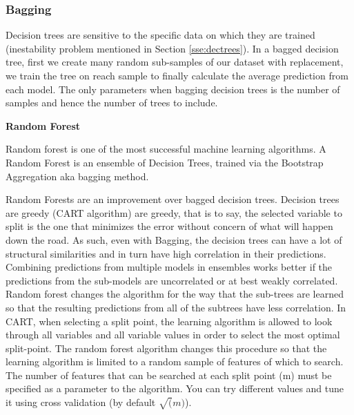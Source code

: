 \documentclass[11pt]{article}
\theoremstyle{definition}
\theoremstyle{remark}
\begin{document}
\subsubsection{Bagging}
\label{se:resrf}

Decision trees are sensitive to the specific data on which they are trained (inestability problem mentioned in Section \ref{sse:dectrees}). In a bagged decision tree, first we create many random sub-samples of our dataset with replacement, we train the tree on reach sample to finally calculate the average prediction from each model. The only parameters when bagging decision trees is the number of samples and hence the number of trees to include.

\textbf{Random Forest}

Random forest is one of the most successful machine learning algorithms. A Random Forest is an ensemble of Decision Trees, trained via the  Bootstrap Aggregation aka bagging method. 

Random Forests are an improvement over bagged decision trees. Decision trees are greedy (CART algorithm) are greedy, that is to say, the selected variable to split is the one that minimizes the error without concern of what will happen down the road. As such, even with Bagging, the decision trees can have a lot of structural similarities and in turn have high correlation in their predictions. Combining predictions from multiple models in ensembles works better if the predictions from the sub-models are uncorrelated or at best weakly correlated.
Random forest changes the algorithm for the way that the sub-trees are learned so that the resulting predictions from all of the subtrees have less correlation. In CART, when selecting a split point, the learning algorithm is allowed to look through all variables and all variable values in order to select the most optimal split-point. The random forest algorithm changes this procedure so that the learning algorithm is limited to a random sample of features of which to search. The number of features that can be searched at each split point (m) must be specified as a parameter to the algorithm. You can try different values and tune it using cross validation (by default $\sqrt(m)$).
\end{document}
